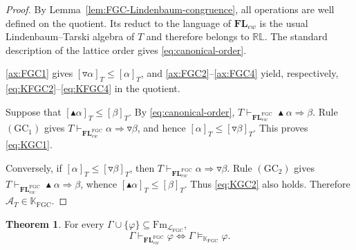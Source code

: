 \documentclass[final,12pt,times]{elsarticle}
\theoremstyle{plain}
\theoremstyle{definition}
\newtheorem{theorem}[definition]{Theorem}
\theoremstyle{break}
\begin{document}
\begin{proof}
By Lemma~\ref{lem:FGC-Lindenbaum-congruence}, all operations are well defined on
the quotient.  Its reduct to the language of $\mathbf{FL}_{ew}$ is the usual
Lindenbaum--Tarski algebra of $T$ and therefore belongs to $\mathbb{RL}$.  The
standard description of the lattice order gives \eqref{eq:canonical-order}.

\eqref{ax:FGC1} gives
$[\triangledown\alpha]_T\le[\alpha]_T$, and
\eqref{ax:FGC2}--\eqref{ax:FGC4} yield, respectively,
\eqref{eq:KFGC2}--\eqref{eq:KFGC4} in the quotient.

Suppose that $[\blacktriangle\alpha]_T\le[\beta]_T$.  By
\eqref{eq:canonical-order},
$T\vdash_{\mathbf{FL}^{\mathrm{FGC}}_{ew}}
\blacktriangle\alpha\Rightarrow\beta$.  Rule $(\mathrm{GC}_1)$ gives
$T\vdash_{\mathbf{FL}^{\mathrm{FGC}}_{ew}}
\alpha\Rightarrow\triangledown\beta$, and hence
$[\alpha]_T\le[\triangledown\beta]_T$.  This proves
\eqref{eq:KGC1}.  

Conversely, if
$[\alpha]_T\le[\triangledown\beta]_T$, then
$T\vdash_{\mathbf{FL}^{\mathrm{FGC}}_{ew}}
\alpha\Rightarrow\triangledown\beta$.  Rule $(\mathrm{GC}_2)$ gives
$T\vdash_{\mathbf{FL}^{\mathrm{FGC}}_{ew}}
\blacktriangle\alpha\Rightarrow\beta$, whence
$[\blacktriangle\alpha]_T\le[\beta]_T$.  Thus \eqref{eq:KGC2} also holds.
Therefore $\mathscr{A}_T\in\mathbb K_{\mathrm{FGC}}$.
\end{proof}

\begin{theorem}\label{thm:FGC-completeness}
For every $\Gamma\cup\{\varphi\}\subseteq
\mathrm{Fm}_{\mathcal L_{\mathrm{FGC}}}$,
\[
 \Gamma\vdash_{\mathbf{FL}^{\mathrm{FGC}}_{ew}}\varphi
 \Longleftrightarrow
 \Gamma\models_{\mathbb K_{\mathrm{FGC}}}\varphi.
\]
\end{theorem}
\end{document}
